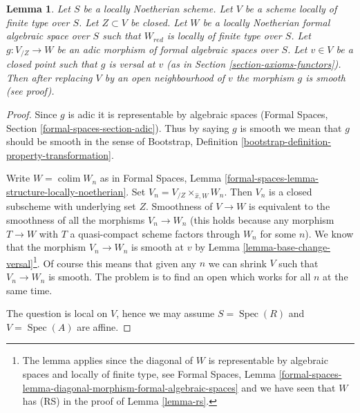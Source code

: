 \documentclass{stacks-project}
\theoremstyle{plain}
\newtheorem{lemma}[subsection]{Lemma}
\theoremstyle{definition}
\theoremstyle{remark}
\numberwithin{equation}{subsection}
\def\colim{\mathop{\mathrm{colim}}\nolimits}
\def\Spec{\mathop{\mathrm{Spec}}}
\begin{document}
\begin{lemma}
\label{lemma-openness-smoothness}
Let $S$ be a locally Noetherian scheme. Let $V$ be a scheme locally
of finite type over $S$. Let $Z \subset V$ be closed. Let $W$ be
a locally Noetherian formal algebraic space over $S$ such that
$W_{red}$ is locally of finite type over $S$. Let $g : V_{/Z} \to W$
be an adic morphism of formal algebraic spaces over $S$. Let $v \in V$
be a closed point such that $g$ is versal at $v$ (as in
Section \ref{section-axioms-functors}).
Then after replacing $V$ by an open neighbourhood of $v$ the
morphism $g$ is smooth (see proof).
\end{lemma}

\begin{proof}
Since $g$ is adic it is representable by algebraic spaces (Formal Spaces,
Section \ref{formal-spaces-section-adic}).
Thus by saying $g$ is smooth we mean that $g$ should be smooth
in the sense of
Bootstrap, Definition \ref{bootstrap-definition-property-transformation}.

\medskip\noindent
Write $W = \colim W_n$ as in Formal Spaces, Lemma
\ref{formal-spaces-lemma-structure-locally-noetherian}.
Set $V_n = V_{/Z} \times_{\hat x, W} W_n$.
Then $V_n$ is a closed subscheme with underlying set $Z$.
Smoothness of $V \to W$ is equivalent to the smoothness
of all the morphisms $V_n \to W_n$ (this holds because any morphism
$T \to W$ with $T$ a quasi-compact scheme factors through
$W_n$ for some $n$). We know that the morphism $V_n \to W_n$
is smooth at $v$ by
Lemma \ref{lemma-base-change-versal}\footnote{The lemma applies since
the diagonal of $W$ is representable by algebraic spaces and
locally of finite type, see Formal Spaces, Lemma
\ref{formal-spaces-lemma-diagonal-morphism-formal-algebraic-spaces}
and we have seen that $W$ has (RS) in the proof of Lemma \ref{lemma-rs}.}.
Of course this means that given any $n$ we can shrink $V$
such that $V_n \to W_n$ is smooth. The problem is to find
an open which works for all $n$ at the same time.

\medskip\noindent
The question is local on $V$, hence we may assume $S = \Spec(R)$ and
$V = \Spec(A)$ are affine.


\end{proof}
\end{document}
